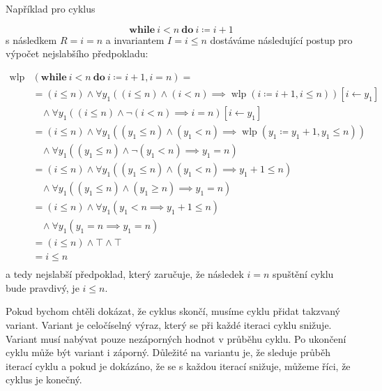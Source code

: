 Například pro cyklus

\begin{equation*}
    \textbf{while} \ i < n \ \textbf{do} \ i \coloneqq i + 1
\end{equation*}
s následkem $R = i = n$ a invariantem $I = i \leq n$ dostáváme následující postup pro výpočet nejslabšího předpokladu:

\begin{align*}
    \operatorname{wlp}&(\textbf{while} \ i < n \ \textbf{do} \ i \coloneqq i + 1, i = n) = \\
        & = (i \leq n) \land \forall y_1 \left( (i \leq n) \land (i < n) \implies \operatorname{wlp}(i \coloneqq i + 1, i \leq n) \right)[i \leftarrow y_1] \\
        & \ \ \ \ \land \forall y_1 \left( (i \leq n) \land \neg (i < n) \implies i = n \right)[i \leftarrow y_1] \\
        & = (i \leq n) \land \forall y_1 \left( (y_1 \leq n) \land (y_1 < n) \implies \operatorname{wlp}(y_1 \coloneqq y_1 + 1, y_1 \leq n) \right) \\
        & \ \ \ \ \land \forall y_1 \left( (y_1 \leq n) \land \neg (y_1 < n) \implies y_1 = n \right) \\
        & = (i \leq n) \land \forall y_1 \left( (y_1 \leq n) \land (y_1 < n) \implies y_1 + 1 \leq n \right) \\
        & \ \ \ \ \land \forall y_1 \left( (y_1 \leq n) \land (y_1 \geq n) \implies y_1 = n \right) \\
        & = (i \leq n) \land \forall y_1 \left( y_1 < n \implies y_1 + 1 \leq n \right) \\
        & \ \ \ \ \land \forall y_1 \left( y_1 = n \implies y_1 = n \right) \\
        & = (i \leq n) \land \top \land \top \\
        & = i \leq n \\
\end{align*}
a tedy nejslabší předpoklad, který zaručuje, že následek $i = n$ spuštění cyklu bude pravdivý, je $i \leq n$.

Pokud bychom chtěli dokázat, že cyklus skončí, musíme cyklu přidat takzvaný variant.
Variant je celočíselný výraz, který se při každé iteraci cyklu snižuje.
Variant musí nabývat pouze nezáporných hodnot v průběhu cyklu.
Po ukončení cyklu může být variant i záporný.
Důležité na variantu je, že sleduje průběh iterací cyklu a pokud
je dokázáno, že se s každou iterací snižuje, můžeme říci, že cyklus je konečný.


